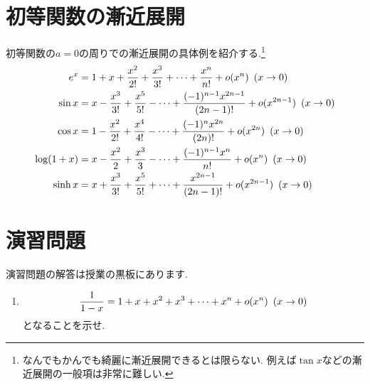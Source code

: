 \documentclass[dvipdfmx,a4paper,11pt]{article}
\theoremstyle{definition}
\begin{document}
 \section{初等関数の漸近展開}

 初等関数の$a=0$の周りでの漸近展開の具体例を紹介する.\footnote{なんでもかんでも綺麗に漸近展開できるとは限らない. 例えば$\tan x$などの漸近展開の一般項は非常に難しい.}
\begin{align*}
\begin{split}
e^x &= 1 + x+  \frac{x^2}{2!} + \frac{x^3}{3!}  + \cdots  + 
 \frac{ x^{n}}{n!} + o(x^{n}) \text{\,\,\,}(x \rightarrow 0) \\
\sin x &= x - \frac{x^3}{3!} + \frac{x^5}{5!} - \cdots  + 
 \frac{(-1)^{n-1} x^{2n-1}}{(2n-1)!} 
 + o(x^{2n-1}) \text{\,\,\,}(x \rightarrow 0) \\
 \cos x &= 1 - \frac{x^2}{2!} + \frac{x^4}{4!} - \cdots  + 
 \frac{(-1)^{n} x^{2n}}{(2n)!} 
 + o(x^{2n}) \text{\,\,\,}(x \rightarrow 0) \\
 \log(1+x) &= x - \frac{x^2}{2} + \frac{x^3}{3}  - \cdots   
 + \frac{ (-1)^{n-1}x^{n}}{n!} + o(x^{n}) \text{\,\,\,}(x \rightarrow 0) \\
  \sinh x &= x + \frac{x^3}{3!} + \frac{x^5}{5!} + \cdots  + 
 \frac{x^{2n-1}}{(2n-1)!} 
 + o(x^{2n-1}) \text{\,\,\,}(x \rightarrow 0) \\
\end{split}
\end{align*}

 
\section{演習問題}
演習問題の解答は授業の黒板にあります.
\begin{enumerate}
\item 
$$
\frac{1}{1-x} = 1 + x+  x^2 + x^3  + \cdots   
 + x^{n} + o(x^{n}) \text{\,\,\,}(x \rightarrow 0) 
$$
となることを示せ.

\end{enumerate}



 
\end{document}
